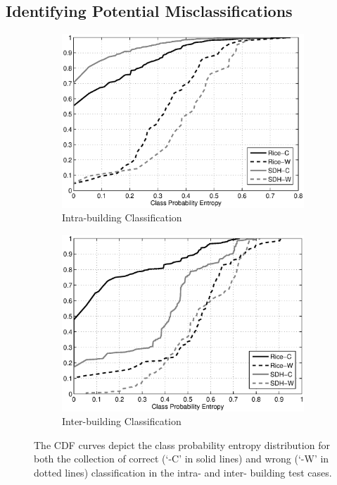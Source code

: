\subsection{Identifying Potential Misclassifications}
\begin{figure}[ht!]
\centering
	\begin{subfigure}{0.48\textwidth}
                \centering
		\includegraphics[width=\textwidth]{./fig/cdf_intra.eps}
                \caption{Intra-building Classification}
                \label{fig:cdf_intra}
	\end{subfigure}
	\begin{subfigure}{0.48\textwidth}
                \centering
		\includegraphics[width=\textwidth]{./fig/cdf_inter.eps}
                \caption{Inter-building Classification}
                \label{fig:cdf_inter}
	\end{subfigure}
\caption{The CDF curves depict the class probability entropy distribution for both the collection of correct (`-C' in solid lines) and wrong (`-W' in dotted lines) classification in the intra- and inter- building test cases.}
\label{fig:cdf}
\end{figure}

